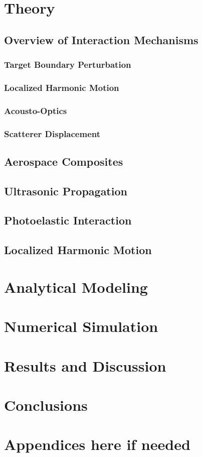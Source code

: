 \documentclass[10pt,a4paper]{eitExjobb}
\begin{document}
	\chapter{Theory}
	
	\section{Overview of Interaction Mechanisms}
	
	\subsection{Target Boundary Perturbation}
	
	\subsection{Localized Harmonic Motion}
	
	\subsection{Acousto-Optics}
	
	\subsection{Scatterer Displacement}
	
	\section{Aerospace Composites}
	
	\section{Ultrasonic Propagation}
	
	\section{Photoelastic Interaction}
	
	\section{Localized Harmonic Motion}
	
	\chapter{Analytical Modeling}
	
	\chapter{Numerical Simulation}
	
	\chapter{Results and Discussion}
	
	\chapter{Conclusions}
	
	
	
	
	\appendix
	
	\chapter{Appendices here if needed}
	
\end{document}
